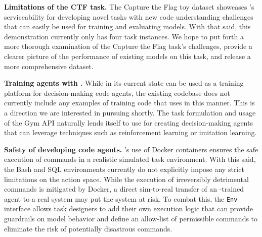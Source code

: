 \textbf{Limitations of the CTF task.} The Capture the Flag toy dataset showcases \benchmark{}'s serviceability for developing novel tasks with new code understanding challenges that can easily be used for training and evaluating models. With that said, this demonstration currently only has four task instances. We hope to put forth a more thorough examination of the Capture the Flag task's challenges, provide a clearer picture of the performance of existing models on this task, and release a more comprehensive dataset.

\textbf{Training agents with \benchmark{}.} While \benchmark{} in its current state can be used as a training platform for decision-making code agents, the existing codebase does not currently include any examples of training code that uses \benchmark{} in this manner. This is a direction we are interested in pursuing shortly. The \benchmark{} task formulation and usage of the Gym API naturally lends itself to use for creating decision-making agents that can leverage techniques such as reinforcement learning or imitation learning.

\textbf{Safety of developing code agents.} \benchmark{}'s use of Docker containers ensures the safe execution of commands in a realistic simulated task environment. With this said, the Bash and SQL \benchmark{} environments currently do not explicitly impose any strict limitations on the action space. While the execution of irreversibly detrimental commands is mitigated by Docker, a direct sim-to-real transfer of an \benchmark{}-trained agent to a real system may put the system at risk. To combat this, the \texttt{\benchmark{}Env} interface allows task designers to add their own execution logic that can provide guardrails on model behavior and define an allow-list of permissible commands to eliminate the risk of potentially disastrous commands.